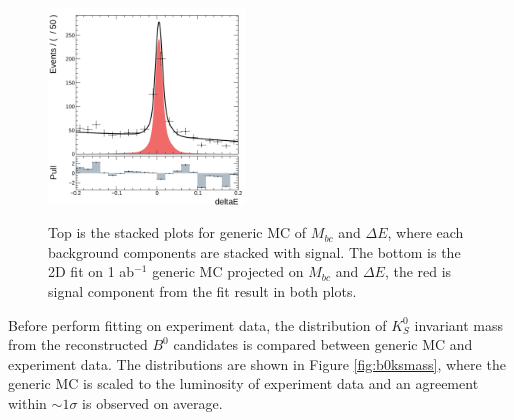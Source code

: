 \begin{figure}[H]
	\begin{minipage}[b]{0.5\linewidth}
		\centering 
		\includegraphics[height=5.2cm]{figures/dE-hist-2d}
		\label{}
	\end{minipage}
	\caption{Top is the stacked plots for generic MC of $M_{bc}$ and $\Delta E$, where each background components are stacked with signal. The bottom is the 2D fit on 1 ab$^{-1}$ generic MC projected on $M_{bc}$ and $\Delta E$, the red is signal component from the fit result in both plots.}
	\label{fig:2Dgen}
\end{figure}

Before perform fitting on experiment data, the distribution of $K_S^0$ invariant mass from the reconstructed $B^0$ candidates is compared between generic MC and experiment data. The distributions are shown in Figure \ref{fig:b0ksmass}, where the generic MC is scaled to the luminosity of experiment data and an agreement within $\sim 1\sigma$ is observed on average.

